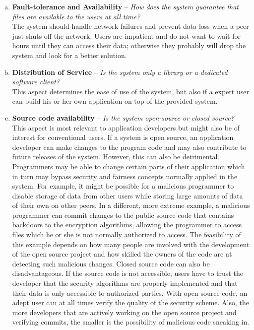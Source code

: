 \begin{enumerate}[(a)]
\item \textbf{Fault-tolerance and Availability} -- \textit{How does the system guarantee that files are available to the users at all time?}\\
The system should handle network failures and prevent data loss when a peer just shuts off the network. Users are impatient and do not want to wait for hours until they can access their data; otherwise they probably will drop the system and look for a better solution.

\item \textbf{Distribution of Service} -- \textit{Is the system only a library or a dedicated software client?}\\
This aspect determines the ease of use of the system, but also if a expert user can build his or her own application on top of the provided system.

\item \textbf{Source code availability} -- \textit{Is the system open-source or closed source?}\\
This aspect is most relevant to application developers but might also be of interest for conventional users. If a system is open source, an application developer can make changes to the program code and may also contribute to future releases of the system. However, this can also be detrimental. Programmers may be able to change certain parts of their application which in turn may bypass security and fairness concepts normally applied in the system. For example, it might be possible for a malicious programmer to disable storage of data from other users while storing large amounts of data of their own on other peers. In a different, more extreme example, a malicious programmer can commit changes to the public source code that contains backdoors to the encryption algorithms, allowing the programmer to access files which he or she is not normally authorized to access. The feasibility of this example depends on how many people are involved with the development of the open source project and how skilled the owners of the code are at detecting such malicious changes.
Closed source code can also be disadvantageous. If the source code is not accessible, users have to trust the developer that the security algorithms are properly implemented and that their data is only accessible to authorized parties. With open source code, an adept user can at all times verify the quality of the security scheme. Also, the more developers that are actively working on the open source project and verifying commits, the smaller is the possibility of malicious code sneaking in.


\end{enumerate}
